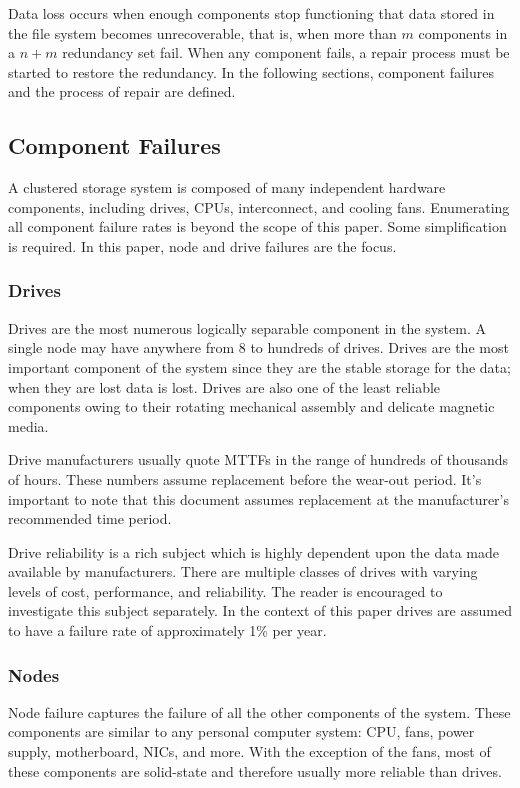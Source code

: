 \documentclass[11pt]{article}
\numberwithin{equation}{section}
\begin{document}
Data loss occurs when enough components stop functioning that data stored in
the file system becomes unrecoverable, that is, when more than $m$ components
in a $n+m$ redundancy set fail.  When any component fails, a repair process
must be started to restore the redundancy.  In the following sections,
component failures and the process of repair are defined.

\subsection{Component Failures}

A clustered storage system is composed of many independent hardware
components, including drives, CPUs, interconnect, and cooling fans.
Enumerating all component failure rates is beyond the scope of this paper.
Some simplification is required.  In this paper, node and drive failures are
the focus.

\subsubsection{Drives}

Drives are the most numerous logically separable component in the system.  A
single node may have anywhere from 8 to hundreds of drives.  Drives are the
most important component of the system since they are the stable storage for
the data; when they are lost data is lost.  Drives are also one of the least
reliable components owing to their rotating mechanical assembly and delicate
magnetic media.  

Drive manufacturers usually quote MTTFs in the range of hundreds of thousands
of hours.  These numbers assume replacement before the wear-out period.  It's
important to note that this document assumes replacement at the manufacturer's
recommended time period.

Drive reliability is a rich subject which is highly dependent upon the data
made available by manufacturers.  There are multiple classes of drives with
varying levels of cost, performance, and reliability.  The reader is
encouraged to investigate this subject separately.  In the context of this
paper drives are assumed to have a failure rate of approximately 1\% per year.

\subsubsection{Nodes}

Node failure captures the failure of all the other components of the system.
These components are similar to any personal computer system:  CPU, fans,
power supply, motherboard, NICs, and more.  With the exception of the fans,
most of these components are solid-state and therefore usually more reliable
than drives.  
\end{document}
